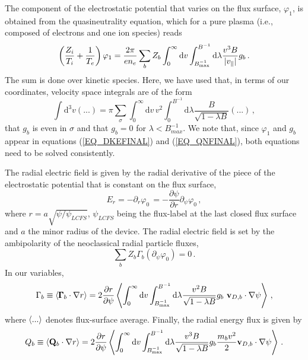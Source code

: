 The component of the electrostatic potential that varies on the flux surface, $\varphi_1$, is obtained from the quasineutrality equation, which for a pure plasma (i.e., composed of electrons and one ion species) reads
\begin{equation}
\left(\frac{Z_i}{T_i}+\frac{1}{T_e}\right)\varphi_1 =\frac{2\pi}{en_e}\sum_b Z_b \int_0^\infty\mathrm{d} v \int_{B^{-1}_{{\rm max}}}^{B^{-1}}\mathrm{d}\lambda\frac{v^3 B}{|v_\parallel |}g_b\,.
\label{EQ_QNFINAL}
\end{equation}
The sum is done over kinetic species. Here, we have used that, in terms of our coordinates, velocity space integrals are of the form
\begin{equation}
\int\mathrm{d}^3v (...) = \pi \sum_\sigma\int_0^\infty\mathrm{d}v\,v^2\int_0^{B^{-1}}\mathrm{d}\lambda\frac{B}{\sqrt{1-\lambda B}} (...) \,,
\label{EQ_VELINT}
\end{equation}
that $g_b$ is even in $\sigma$ and that $g_b=0$ for $\lambda<B_{max}^{-1}$. We note that, since $\varphi_1$ and $g_b$ appear in equations (\ref{EQ_DKEFINAL}) and (\ref{EQ_QNFINAL}), both equations need to be solved consistently.

The radial electric field is given by the radial derivative of the piece of the electrostatic potential that is constant on the flux surface, 
\begin{equation}
E_r =-\partial_r\varphi_0\, = -\frac{\partial \psi}{\partial r}\partial_\psi\varphi_0\,,
\end{equation}
where $r=a\sqrt{\psi/\psi_{LCFS}}$, $\psi_{LCFS}$ being the flux-label at the last closed flux surface and $a$ the minor radius of the device. The radial electric field is set by the ambipolarity of the neoclassical radial particle fluxes,
\begin{equation}
\sum_b Z_b\Gamma_b(\partial_\psi\varphi_0) =0\,.\label{EQ_AMB}
\end{equation}
In our variables,
\begin{equation}
\Gamma_b\equiv\left\langle{\pmb{\Gamma}_b\cdot\nabla r}\right\rangle = 2\frac{\partial r}{\partial\psi}\left\langle\int_0^\infty\mathrm{d} v \int_{B^{-1}_{{\rm max}}}^{B^{-1}}\mathrm{d}\lambda\frac{v^2 B}{\sqrt{1-\lambda B}} g_b ~\mathbf{v}_{D,b}\cdot\nabla\psi \right\rangle\nonumber\,,\label{EQ_GAMMA}
\end{equation}
where $\left\langle{...}\right\rangle$ denotes flux-surface average. Finally, the radial energy flux is given by
\begin{equation}
Q_b\equiv\left\langle{\mathbf{Q}_b\cdot\nabla r}\right\rangle = 2\frac{\partial r}{\partial\psi}\left\langle \int_0^\infty\mathrm{d} v \int_{B^{-1}_{{\rm max}}}^{B^{-1}}\mathrm{d}\lambda\frac{v^3 B}{\sqrt{1-\lambda B}} g_b\frac{m_bv^2}{2}\mathbf{v}_{D,b}\cdot\nabla\psi\right\rangle \,.\label{EQ_GAMMAQ}
\end{equation}

